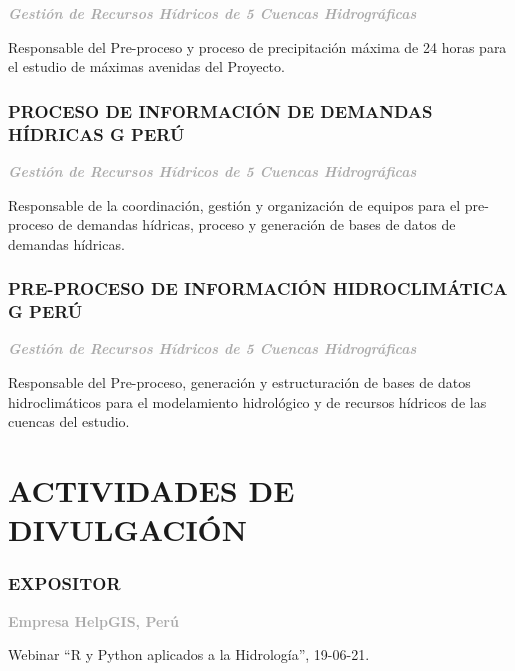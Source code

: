 \documentclass[
  10,
]{article}
\begin{document}
\textcolor{darkgray}{\textbf{\emph{Gestión de Recursos Hídricos de 5 Cuencas Hidrográficas}}}

Responsable del Pre-proceso y proceso de precipitación máxima de 24
horas para el estudio de máximas avenidas del Proyecto.

\hypertarget{proceso-de-informaciuxf3n-de-demandas-huxeddricas-g-peruxfa}{%
\subsubsection{PROCESO DE INFORMACIÓN DE DEMANDAS HÍDRICAS \textbar{} G
\textbar{}
PERÚ}\label{proceso-de-informaciuxf3n-de-demandas-huxeddricas-g-peruxfa}}

\textcolor{darkgray}{\textbf{\emph{Gestión de Recursos Hídricos de 5 Cuencas Hidrográficas}}}

Responsable de la coordinación, gestión y organización de equipos para
el pre-proceso de demandas hídricas, proceso y generación de bases de
datos de demandas hídricas.

\hypertarget{pre-proceso-de-informaciuxf3n-hidroclimuxe1tica-g-peruxfa}{%
\subsubsection{PRE-PROCESO DE INFORMACIÓN HIDROCLIMÁTICA \textbar{} G
\textbar{}
PERÚ}\label{pre-proceso-de-informaciuxf3n-hidroclimuxe1tica-g-peruxfa}}

\textcolor{darkgray}{\textbf{\emph{Gestión de Recursos Hídricos de 5 Cuencas Hidrográficas}}}

Responsable del Pre-proceso, generación y estructuración de bases de
datos hidroclimáticos para el modelamiento hidrológico y de recursos
hídricos de las cuencas del estudio.

\newpage

\hypertarget{actividades-de-divulgaciuxf3n}{%
\section{ACTIVIDADES DE
DIVULGACIÓN}\label{actividades-de-divulgaciuxf3n}}

\hypertarget{expositor}{%
\subsubsection{EXPOSITOR}\label{expositor}}

\textcolor{darkgray}{\textbf{Empresa HelpGIS, Perú}}

Webinar ``R y Python aplicados a la Hidrología'', 19-06-21.
\end{document}
